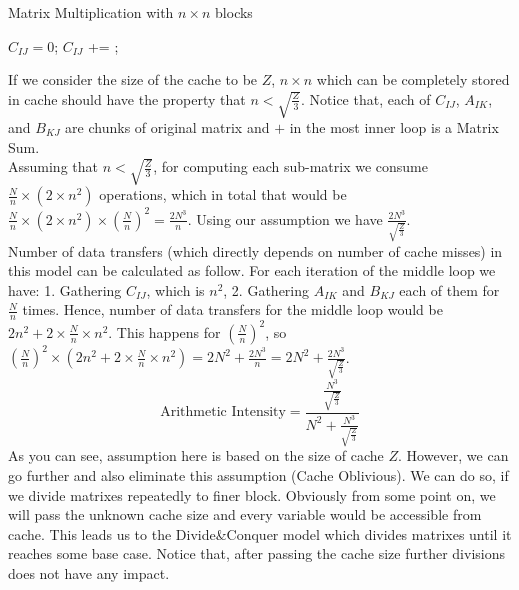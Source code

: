 \documentclass[paper=a4, fontsize=11pt]{scrartcl} %
\numberwithin{equation}{section} %
\numberwithin{figure}{section} %
\numberwithin{table}{section} %
\begin{document}
\begin{algorithm}
\caption{Matrix Multiplication with $n \times n$ blocks}
\label{Block-Alg}
\begin{algorithmic}
		\State $C_{IJ} = 0$;
			\State $C_{IJ}$ += ;
		\EndFor
	\EndFor
\EndFor
\end{algorithmic}
\end{algorithm}

If we consider the size of the cache to be $Z$, $n \times n$ which can be completely stored in cache should have the property that $n < \sqrt{\frac{Z}{3}}$. Notice that, each of $C_{IJ}$, $A_{IK}$, and $B_{KJ}$ are chunks of original matrix and $+$ in the most inner loop is a Matrix Sum.\\
Assuming that $n < \sqrt{\frac{Z}{3}}$, for computing each sub-matrix we consume $ \frac{N}{n} \times (2\times n^{2})$ operations, which in total that would be $\frac{N}{n} \times (2\times n^{2}) \times (\frac{N}{n})^{2} = \frac{2N^{3}}{n}$. Using our assumption we have $\frac{2N^{3}}{\sqrt{\frac{Z}{3}}}$.\\
Number of data transfers (which directly depends on number of cache misses) in this model can be calculated as follow.  For each iteration of the middle loop we have:  1. Gathering $C_{IJ}$, which is $n^{2}$,  2. Gathering $A_{IK}$ and $B_{KJ}$ each of them for $\frac{N}{n}$ times. Hence, number of data transfers for the middle loop would be $2n^{2} + 2 \times \frac{N}{n} \times n^{2}$. This happens for $(\frac{N}{n})^{2}$, so $(\frac{N}{n})^{2} \times (2n^{2} + 2 \times \frac{N}{n} \times n^{2}) = 2N^{2} + \frac{2N^{3}}{n} = 2N^{2} + \frac{2N^{3}}{\sqrt{\frac{Z}{3}}}$.
\begin{equation*}
\text{Arithmetic Intensity} = \frac{\frac{N^{3}}{\sqrt{\frac{Z}{3}}}}{N^{2} + \frac{N^{3}}{\sqrt{\frac{Z}{3}}}}
\end{equation*}
As you can see, assumption here is based on the size of cache $Z$. However, we can go further and also eliminate this assumption (Cache Oblivious). We can do so, if we divide matrixes repeatedly to finer block. Obviously from some point on, we will pass the unknown cache size and every variable would be accessible from cache. This leads us to the Divide\&Conquer model which divides matrixes until it reaches some base case. Notice that, after passing the cache size further divisions does not have any impact.\\
\end{document}
